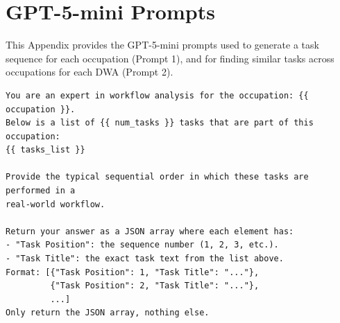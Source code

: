\section{GPT-5-mini Prompts}
\label{app:prompts}

This Appendix provides the GPT-5-mini prompts used to generate a task sequence for each occupation (Prompt 1), and for finding similar tasks across occupations for each DWA (Prompt 2). \\

\begin{tcolorbox}[colback=gray!5, colframe=black!60, title={Prompt \#1: GPT-5-mini Prompt for Ordering of Tasks in Occupation}]
\footnotesize
\begin{verbatim}
You are an expert in workflow analysis for the occupation: {{ occupation }}. 
Below is a list of {{ num_tasks }} tasks that are part of this occupation:
{{ tasks_list }}

Provide the typical sequential order in which these tasks are performed in a 
real-world workflow. 

Return your answer as a JSON array where each element has:
- "Task Position": the sequence number (1, 2, 3, etc.).
- "Task Title": the exact task text from the list above.
Format: [{"Task Position": 1, "Task Title": "..."}, 
         {"Task Position": 2, "Task Title": "..."},
         ...]
Only return the JSON array, nothing else.
\end{verbatim}
\end{tcolorbox}

